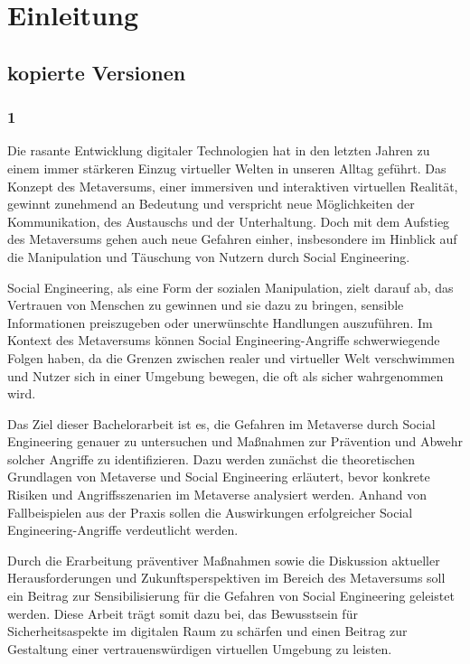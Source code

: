 \chapter{Einleitung}\label{ch:Einleitung}

\section{kopierte Versionen}
\subsection*{1}
Die rasante Entwicklung digitaler Technologien hat in den letzten Jahren zu einem immer stärkeren Einzug virtueller Welten in unseren Alltag geführt. Das Konzept des Metaversums, einer immersiven und interaktiven virtuellen Realität, gewinnt zunehmend an Bedeutung und verspricht neue Möglichkeiten der Kommunikation, des Austauschs und der Unterhaltung. Doch mit dem Aufstieg des Metaversums gehen auch neue Gefahren einher, insbesondere im Hinblick auf die Manipulation und Täuschung von Nutzern durch Social Engineering.

Social Engineering, als eine Form der sozialen Manipulation, zielt darauf ab, das Vertrauen von Menschen zu gewinnen und sie dazu zu bringen, sensible Informationen preiszugeben oder unerwünschte Handlungen auszuführen. Im Kontext des Metaversums können Social Engineering-Angriffe schwerwiegende Folgen haben, da die Grenzen zwischen realer und virtueller Welt verschwimmen und Nutzer sich in einer Umgebung bewegen, die oft als sicher wahrgenommen wird.

Das Ziel dieser Bachelorarbeit ist es, die Gefahren im Metaverse durch Social Engineering genauer zu untersuchen und Maßnahmen zur Prävention und Abwehr solcher Angriffe zu identifizieren. Dazu werden zunächst die theoretischen Grundlagen von Metaverse und Social Engineering erläutert, bevor konkrete Risiken und Angriffsszenarien im Metaverse analysiert werden. Anhand von Fallbeispielen aus der Praxis sollen die Auswirkungen erfolgreicher Social Engineering-Angriffe verdeutlicht werden.

Durch die Erarbeitung präventiver Maßnahmen sowie die Diskussion aktueller Herausforderungen und Zukunftsperspektiven im Bereich des Metaversums soll ein Beitrag zur Sensibilisierung für die Gefahren von Social Engineering geleistet werden. Diese Arbeit trägt somit dazu bei, das Bewusstsein für Sicherheitsaspekte im digitalen Raum zu schärfen und einen Beitrag zur Gestaltung einer vertrauenswürdigen virtuellen Umgebung zu leisten.

